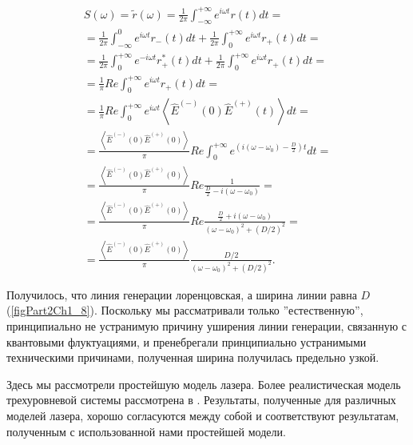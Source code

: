 \begin{eqnarray}
S\left(\omega\right) = \tilde{r}\left(\omega\right) = 
\frac{1}{2\pi}
\int_{-\infty}^{+\infty}e^{i \omega t} r\left(t\right) dt =
\nonumber \\
=
\frac{1}{2\pi}
\int_{-\infty}^0e^{i \omega t} r_{-}\left(t\right) dt +
\frac{1}{2\pi}
\int_0^{+\infty}e^{i \omega t} r_{+}\left(t\right) dt = 
\nonumber \\
=
\frac{1}{2\pi}
\int_0^{+\infty}e^{- i \omega t} r_{+}^{*}\left(t\right) dt +
\frac{1}{2\pi}
\int_0^{+\infty}e^{i \omega t} r_{+}\left(t\right) dt = 
\nonumber \\
=
\frac{1}{\pi} Re
\int_0^{+\infty}e^{i \omega t} r_{+}\left(t\right) dt = 
\nonumber \\
= \frac{1}{\pi}Re
\int_0^{+\infty}e^{i \omega t}
\left<\hat{E}^{(-)}\left(0\right)\hat{E}^{(+)}\left(t\right)\right> dt
=
\nonumber \\
= \frac{\left<\hat{E}^{(-)}\left(0\right)\hat{E}^{(+)}\left(0\right)\right>}{\pi}Re
\int_0^{+\infty}e^{\left(i \left(\omega - \omega_0\right) - \frac{D}{2} \right) t} dt
=
\nonumber \\
=
\frac{\left<\hat{E}^{(-)}\left(0\right)\hat{E}^{(+)}\left(0\right)\right>}{\pi}Re
\frac{1}{\frac{D}{2} - i \left(\omega - \omega_0\right)}
=
\nonumber \\
=
\frac{\left<\hat{E}^{(-)}\left(0\right)\hat{E}^{(+)}\left(0\right)\right>}{\pi}Re
\frac{\frac{D}{2} + i \left(\omega - \omega_0\right)}
{\left(\omega - \omega_0\right)^2 + \left(D/2\right)^2}
=
\nonumber \\
=
\frac{\left<\hat{E}^{(-)}\left(0\right)\hat{E}^{(+)}\left(0\right)\right>}{\pi}
\frac{D/2}{\left(\omega - \omega_0\right)^2 + \left(D/2\right)^2}. 
\label{eqCh3_22}
\end{eqnarray}




Получилось, что линия генерации лоренцовская, а ширина линии равна $D$ 
(\autoref{figPart2Ch1_8}). Поскольку мы рассматривали только ''естественную'',
принципиально не устранимую причину уширения линии генерации,
связанную с квантовыми флуктуациями, и пренебрегали принципиально
устранимыми техническими причинами, полученная ширина получилась
предельно узкой.  

Здесь мы рассмотрели простейшую модель лазера. Более
реалистическая модель трехуровневой системы рассмотрена в
\cite{bHaken1988}. Результаты, полученные для различных моделей
лазера, хорошо согласуются между собой и соответствуют результатам, 
полученным с использованной нами простейшей модели. 
